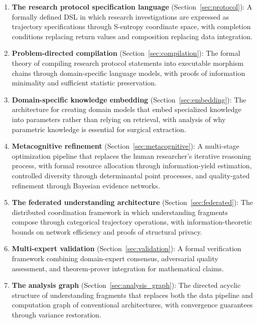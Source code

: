 \documentclass[10pt,twocolumn]{article}
\theoremstyle{definition}
\theoremstyle{remark}
\begin{document}
\begin{enumerate}[nosep]
\item \textbf{The research protocol specification language} (Section~\ref{sec:protocol}): A formally defined DSL in which research investigations are expressed as trajectory specifications through S-entropy coordinate space, with completion conditions replacing return values and composition replacing data integration.

\item \textbf{Problem-directed compilation} (Section~\ref{sec:compilation}): The formal theory of compiling research protocol statements into executable morphism chains through domain-specific language models, with proofs of information minimality and sufficient statistic preservation.

\item \textbf{Domain-specific knowledge embedding} (Section~\ref{sec:embedding}): The architecture for creating domain models that embed specialized knowledge into parameters rather than relying on retrieval, with analysis of why parametric knowledge is essential for surgical extraction.

\item \textbf{Metacognitive refinement} (Section~\ref{sec:metacognitive}): A multi-stage optimization pipeline that replaces the human researcher's iterative reasoning process, with formal resource allocation through information-yield estimation, controlled diversity through determinantal point processes, and quality-gated refinement through Bayesian evidence networks.

\item \textbf{The federated understanding architecture} (Section~\ref{sec:federated}): The distributed coordination framework in which understanding fragments compose through categorical trajectory operations, with information-theoretic bounds on network efficiency and proofs of structural privacy.

\item \textbf{Multi-expert validation} (Section~\ref{sec:validation}): A formal verification framework combining domain-expert consensus, adversarial quality assessment, and theorem-prover integration for mathematical claims.

\item \textbf{The analysis graph} (Section~\ref{sec:analysis_graph}): The directed acyclic structure of understanding fragments that replaces both the data pipeline and computation graph of conventional architectures, with convergence guarantees through variance restoration.
\end{enumerate}
\end{document}
